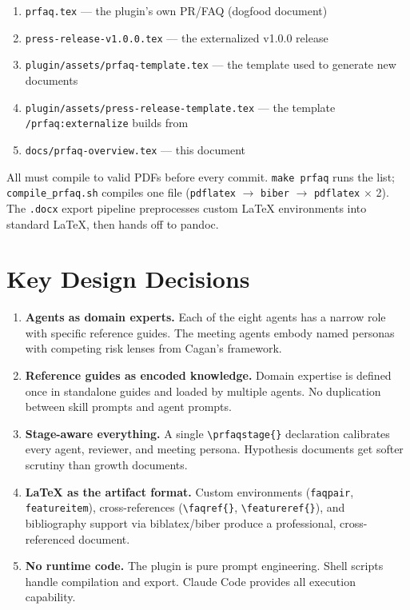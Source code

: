\documentclass[11pt,letterpaper]{article}
\begin{document}
\begin{enumerate}[nosep]
  \item \texttt{prfaq.tex} --- the plugin's own PR/FAQ (dogfood document)
  \item \texttt{press-release-v1.0.0.tex} --- the externalized v1.0.0 release
  \item \texttt{plugin/assets/prfaq-template.tex} --- the template used to
    generate new documents
  \item \texttt{plugin/assets/press-release-template.tex} --- the template
    \texttt{/prfaq:externalize} builds from
  \item \texttt{docs/prfaq-overview.tex} --- this document
\end{enumerate}

All must compile to valid PDFs before every commit. \texttt{make prfaq} runs
the list; \texttt{compile\_prfaq.sh} compiles one file (\texttt{pdflatex}
$\to$ \texttt{biber} $\to$ \texttt{pdflatex} $\times$ 2). The \texttt{.docx}
export pipeline preprocesses custom LaTeX environments into standard LaTeX,
then hands off to pandoc.

\section{Key Design Decisions}

\begin{enumerate}
  \item \textbf{Agents as domain experts.} Each of the eight agents has a narrow
    role with specific reference guides. The meeting agents embody named personas
    with competing risk lenses from Cagan's framework.

  \item \textbf{Reference guides as encoded knowledge.} Domain expertise is
    defined once in standalone guides and loaded by multiple agents. No
    duplication between skill prompts and agent prompts.

  \item \textbf{Stage-aware everything.} A single \texttt{\textbackslash prfaqstage\{\}}
    declaration calibrates every agent, reviewer, and meeting persona. Hypothesis
    documents get softer scrutiny than growth documents.

  \item \textbf{LaTeX as the artifact format.} Custom environments
    (\texttt{faqpair}, \texttt{featureitem}), cross-references
    (\texttt{\textbackslash faqref\{\}}, \texttt{\textbackslash featureref\{\}}),
    and bibliography support via biblatex/biber produce a professional,
    cross-referenced document.

  \item \textbf{No runtime code.} The plugin is pure prompt engineering. Shell
    scripts handle compilation and export. Claude Code provides all execution
    capability.
\end{enumerate}
\end{document}
